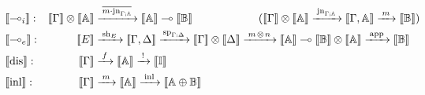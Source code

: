 \begin{align*}
    &\hspace{-20pt}\llbracket \multimap_i \rrbracket : & \llbracket \Gamma \rrbracket \otimes \llbracket \mathbb{A} \rrbracket & \xrightarrow{\hspace{2pt} \overline{m \cdot \text{jn}_{\Gamma;\mathbb{A}}}  \hspace{2pt}}  \llbracket \mathbb{A} \rrbracket \multimap \llbracket \mathbb{B} \rrbracket  \hspace{60pt} (\llbracket \Gamma \rrbracket \otimes \llbracket \mathbb{A} \rrbracket  \xrightarrow{\hspace{2pt} \text{jn}_{\Gamma; \mathbb{A}} \hspace{2pt}} \llbracket \Gamma, \mathbb{A} \rrbracket  \xrightarrow{\hspace{2pt} m \hspace{2pt}}  \llbracket \mathbb{B} \rrbracket )\\
    &\hspace{-20pt}\llbracket \multimap_e \rrbracket : & [\![E]\!] & \xrightarrow{\hspace{2pt}\text{sh}_{E}\hspace{2pt}}   [\![\Gamma,\Delta ]\!]   \xrightarrow{\hspace{1pt}\text{sp}_{\Gamma;\Delta}\hspace{1pt}}  [\![\Gamma ]\!] \otimes [\![\Delta ]\!]  \xrightarrow{\hspace{2pt} m \hspace{1pt} \otimes \hspace{1pt} n \hspace{2pt}} \llbracket \mathbb{A} \rrbracket \multimap \llbracket \mathbb{B} \rrbracket \otimes \llbracket \mathbb{A} \rrbracket  \xrightarrow{\hspace{2pt} \text{app} \hspace{2pt}} \llbracket \mathbb{B} \rrbracket \\
    & \hspace{-20pt} \llbracket \text{dis} \rrbracket : & [\![\Gamma]\!] & \xrightarrow{\hspace{2pt} f \hspace{2pt}} \llbracket \mathbb{A} \rrbracket \xrightarrow{\hspace{2pt} \text{!} \hspace{2pt}} \llbracket \mathbb{I} \rrbracket\\
    & \hspace{-20pt}\llbracket \text{inl} \rrbracket : & [\![\Gamma]\!] & \xrightarrow{\hspace{2pt} m \hspace{2pt}} \llbracket \mathbb{A} \rrbracket \xrightarrow{\hspace{2pt}\inl \hspace{2pt}} \llbracket \typeA \oplus \typeB \rrbracket\\

\end{align*}
